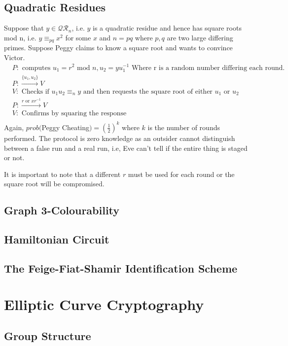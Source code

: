 \documentclass[12pt,a4paper]{article}
\begin{document}
\subsection{Quadratic Residues}
Suppose that $y \in \mathcal{QR}_{n}$, i.e. $y$ is a quadratic residue and hence has square roots mod n, i.e. $y \equiv_{pq} x^{2}$ for some $x$ and $n = pq$ where $p, q$ are two large differing primes. Suppose Peggy claims to know a square root and wants to convince Victor. 
\begin{align*}
	&P: \text{ computes } u_{1} = r^{2} \text{ mod } n, u_{2} = yu_{1}^{-1} \text{ Where r is a random number differing each round.} \\
	&P: \xrightarrow{\{u_1, u_2\}} V \\
	&V: \text{ Checks if } u_{1}u_{2} \equiv_{n} y \text{ and then requests the square root of either } u_{1} \text{ or } u_{2} \\
	&P: \xrightarrow{r \text{ or } xr^{-1}} V \\
	&V: \text{ Confirms by squaring the response} \\ 
\end{align*}
Again, $prob($Peggy Cheating$) = \left(\frac{1}{2}\right)^{k}$ where $k$ is the number of rounds performed. The protocol is zero knowledge as an outsider cannot distinguish between a false run and a real run, i.e, Eve can't tell if the entire thing is staged or not. 

It is important to note that a different $r$ must be used for each round or the square root will be compromised.  


\subsection{Graph 3-Colourability}
\subsection{Hamiltonian Circuit}
\subsection{The Feige-Fiat-Shamir Identification Scheme}

\section{Elliptic Curve Cryptography}

\subsection{Group Structure} 
\end{document}

